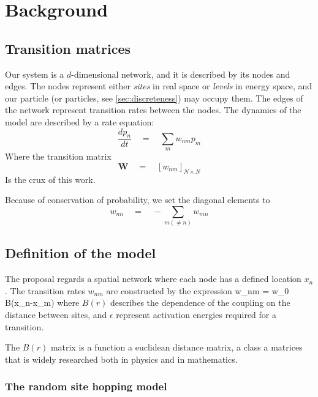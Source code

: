 \chapter{Background}

 



\section{Transition matrices}

Our system is a $d$-dimensional network, and it is
described by its nodes and edges. The nodes represent 
either {\em sites} in real space or {\em levels} in energy space, 
and our particle (or particles, see \ref{sec:discreteness}) may
occupy them. The edges of the network represent transition rates 
between the nodes. The dynamics of the model are described by 
a rate equation:
\[
\frac{dp_n}{dt} \quad = \quad \sum_m w_{nm}p_m
\]
Where the transition matrix 
\[
\mathbf{W} \quad =  \quad \left[ w_{nm}\right]_{N\times N}
\]
Is the crux of this work.

Because of conservation of probability, we set the diagonal
elements to
\[ w_{nn}\quad = \quad -\sum_{m(\ne n)} w_{mn}\]


\section{Definition of the model}


The proposal regards a spatial network where each node
has a defined location $x_n$. The transition rates $w_{nm}$
are constructed by the expression
%
\beq
w_{nm} \quad = \quad w_0 B(x_n-x_m)
\eeq
%
where $B(r)$ describes the dependence of the coupling on the
distance between sites, and $\epsilon$ represent activation
energies required for a transition.


The $B(r)$ matrix is a function a euclidean distance matrix,
a class a matrices that is widely researched 
\cite{skipetrov_eigenvalue_2011, goetschy_non-hermitian_2011,mezard_spectra_1999, bogomolny_spectral_2003}
both in physics and in mathematics.





\subsection{The random site hopping model} \label{sec:random_hopping}




